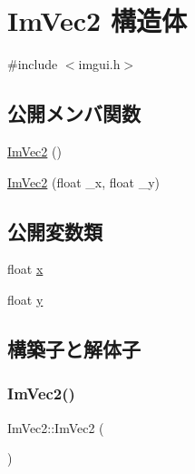 \hypertarget{struct_im_vec2}{}\section{Im\+Vec2 構造体}
\label{struct_im_vec2}


{\ttfamily \#include $<$imgui.\+h$>$}

\subsection*{公開メンバ関数}
\begin{DoxyCompactItemize}
\item 
\mbox{\hyperlink{struct_im_vec2_a5dfa5ab27cc4af6df3cf8d920fc8a294}{Im\+Vec2}} ()
\item 
\mbox{\hyperlink{struct_im_vec2_af2fd51a6c4bf6290676b235533b92c0d}{Im\+Vec2}} (float \+\_\+x, float \+\_\+y)
\end{DoxyCompactItemize}
\subsection*{公開変数類}
\begin{DoxyCompactItemize}
\item 
float \mbox{\hyperlink{struct_im_vec2_a5802a68560961ed8cb8cc5fb2a244c2d}{x}}
\item 
float \mbox{\hyperlink{struct_im_vec2_a1f9d136ca837e147b793b19d25a3a618}{y}}
\end{DoxyCompactItemize}


\subsection{構築子と解体子}
\mbox{\label{struct_im_vec2_a5dfa5ab27cc4af6df3cf8d920fc8a294}} 
\subsubsection{\texorpdfstring{Im\+Vec2()}{ImVec2()}\hspace{0.1cm}{\footnotesize\ttfamily [1/2]}}
{\footnotesize\ttfamily Im\+Vec2\+::\+Im\+Vec2 (\begin{DoxyParamCaption}{ }\end{DoxyParamCaption})\hspace{0.3cm}{\ttfamily [inline]}}

